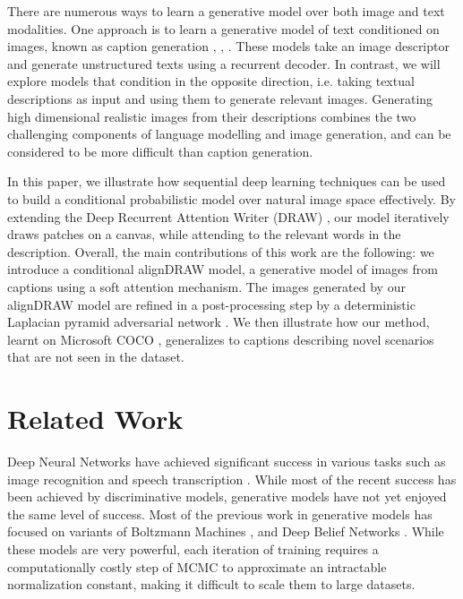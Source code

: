 \documentclass{article} %
\begin{document}
There are numerous ways to learn a generative model over both image and text modalities. One approach is to learn a generative model of text conditioned on images, known as caption generation
\citep{karpathy_captions}, \citep{vinyals_captions}, \citep{xu_captions}. These models take an image descriptor and generate unstructured texts using a recurrent decoder. In contrast, we will explore models that condition in the opposite direction, i.e. taking textual descriptions as input and using them to generate relevant images.
Generating high dimensional realistic images from their descriptions 
combines the two challenging components of language modelling and image generation, and can be considered to be more difficult than caption generation. %

In this paper, we illustrate how sequential deep learning techniques can be used to build a conditional probabilistic model over natural image space effectively. By extending the Deep Recurrent Attention Writer (DRAW) \citep{gregor_draw}, our model iteratively draws patches on a canvas, while attending to the relevant words in the description. Overall, the main contributions of this work are the following: we introduce a conditional alignDRAW model, a generative model of images from captions using a soft attention mechanism. The images generated by our alignDRAW model are refined in a post-processing step by a deterministic Laplacian pyramid adversarial network \citep{denton_lapgan}. We then illustrate how our method, learnt on Microsoft COCO \citep{mscoco}, generalizes to captions describing novel scenarios that are not seen in the dataset.

\section{Related Work}

Deep Neural Networks have achieved significant success in various tasks such as image recognition \citep{krizhevsky_imagenet} and speech transcription \citep{graves_speech}. 
While most of the recent success has been achieved by discriminative models, generative models have not yet enjoyed the same level of success. Most of the previous work in generative models has focused on variants of Boltzmann Machines \citep{smolensky_rbm}, \citep{russ_dbm} and Deep Belief Networks \citep{hinton_dbn}. While these models are very powerful, each iteration of training requires a computationally costly step of MCMC to approximate an intractable normalization constant, making it difficult to scale them to large datasets.
\end{document}
